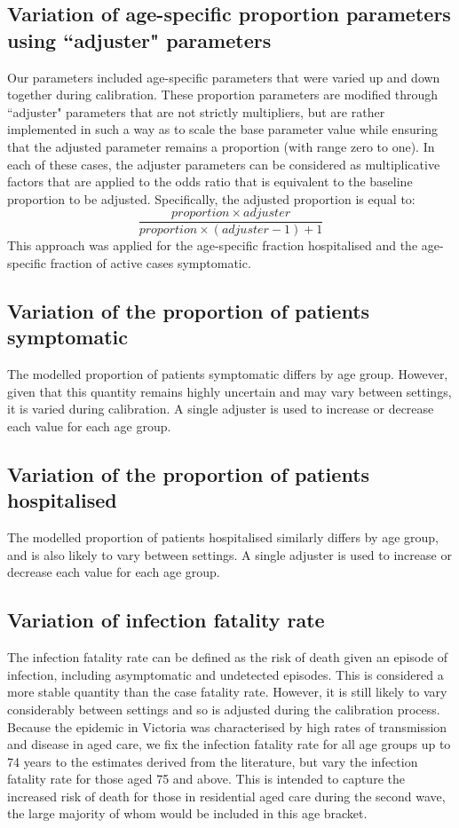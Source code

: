 \subsection{Variation of age-specific proportion parameters using ``adjuster" parameters}
Our parameters included age-specific parameters that were varied up and down together during calibration. These proportion parameters are modified through ``adjuster" parameters that are not strictly multipliers, but are rather implemented in such a way as to scale the base parameter value while ensuring that the adjusted parameter remains a proportion (with range zero to one). In each of these cases, the adjuster parameters can be considered as multiplicative factors that are applied to the odds ratio that is equivalent to the baseline proportion to be adjusted. Specifically, the adjusted proportion is equal to:
\[\frac{proportion \times adjuster}{proportion \times (adjuster-1)+1}\]
This approach was applied for the age-specific fraction hospitalised and the age-specific fraction of active cases symptomatic.

\subsection{Variation of the proportion of patients symptomatic}
The modelled proportion of patients symptomatic differs by age group. However, given that this quantity remains highly uncertain and may vary between settings, it is varied during calibration. A single adjuster is used to increase or decrease each value for each age group.

\subsection{Variation of the proportion of patients hospitalised}
The modelled proportion of patients hospitalised similarly differs by age group, and is also likely to vary between settings. A single adjuster is used to increase or decrease each value for each age group.

\subsection{Variation of infection fatality rate}\label{vary_ifr}

The infection fatality rate can be defined as the risk of death given an episode of infection, including asymptomatic and undetected episodes. This is considered a more stable quantity than the case fatality rate. However, it is still likely to vary considerably between settings and so is adjusted during the calibration process. Because the epidemic in Victoria was characterised by high rates of transmission and disease in aged care, we fix the infection fatality rate for all age groups up to 74 years to the estimates derived from the literature, but vary the infection fatality rate for those aged 75 and above. This is intended to capture the increased risk of death for those in residential aged care during the second wave, the large majority of whom would be included in this age bracket.


